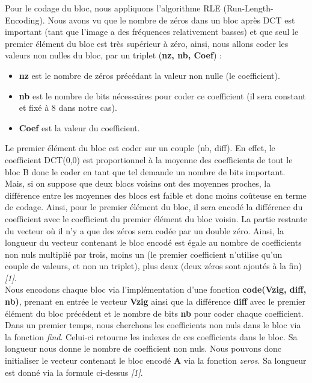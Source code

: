 \documentclass[a4paper, 12pt]{article}
\begin{document}
Pour le codage du bloc, nous appliquons l'algorithme RLE (Run-Length-Encoding). Nous avons vu que le nombre de zéros dans un bloc après DCT est important (tant que l'image a des fréquences relativement basses) et que seul le premier élément du bloc est très supérieur à zéro, ainsi, nous allons coder les valeurs non nulles du bloc, par un triplet (\textbf{nz, nb, Coef}) :
\begin{itemize}
	\item \textbf{nz} est le nombre de zéros précédant la valeur non nulle (le coefficient).
	\item \textbf{nb} est le nombre de bits nécessaires pour coder ce coefficient (il sera constant et fixé à 8 dans notre cas).
	\item \textbf{Coef} est la valeur du coefficient.
\end{itemize}
Le premier élément du bloc est coder sur un couple (nb, diff). En effet, le coefficient DCT(0,0) est proportionnel à la moyenne des coefficients de tout le bloc B donc le coder en tant que tel demande un nombre de bits important. Mais, si on suppose que deux blocs voisins ont des moyennes proches, la différence entre les moyennes des blocs est faible et donc moins coûteuse en terme de codage. Ainsi, pour le premier élément du bloc, il sera encodé la différence du coefficient avec le coefficient du premier élément du bloc voisin. La partie restante du vecteur où il n’y a que des zéros sera codée par un double zéro. Ainsi, la longueur du vecteur contenant le bloc encodé est égale au nombre de coefficients non nuls multiplié par trois, moins un (le premier coefficient n'utilise qu'un couple de valeurs, et non un triplet), plus deux (deux zéros sont ajoutés à la fin) \textit{[1]}.\\

Nous encodons chaque bloc via l'implémentation d'une fonction \textbf{code(Vzig, diff, nb)}, prenant en entrée le vecteur \textbf{Vzig} ainsi que la différence \textbf{diff} avec le premier élément du bloc précédent et le nombre de bits \textbf{nb} pour coder chaque coefficient.\\

Dans un premier temps, nous cherchons les coefficients non nuls dans le bloc via la fonction \textit{find}. Celui-ci retourne les indexes de ces coefficients dans le bloc. Sa longueur nous donne le nombre de coefficient non nuls. Nous pouvons donc initialiser le vecteur contenant le bloc encodé \textbf{A} via la fonction \textit{zeros}. Sa longueur est donné via la formule ci-dessus \textit{[1]}.
\end{document}
